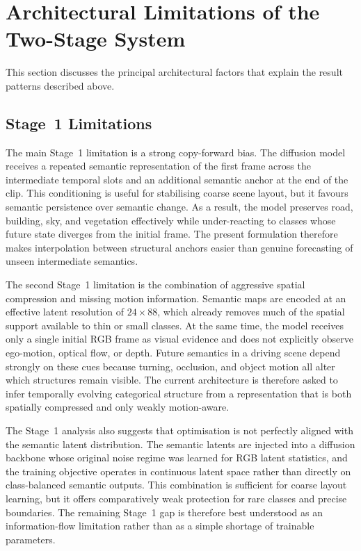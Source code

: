 \FloatBarrier
\section{Architectural Limitations of the Two-Stage System}
\label{sec:stage1_limitations}

This section discusses the principal architectural factors that explain the result patterns described above.

\subsection{Stage~1 Limitations}
\label{subsec:stage1_limitations_detail}

The main Stage~1 limitation is a strong copy-forward bias. The diffusion model receives a repeated semantic representation of the first frame across the intermediate temporal slots and an additional semantic anchor at the end of the clip. This conditioning is useful for stabilising coarse scene layout, but it favours semantic persistence over semantic change. As a result, the model preserves road, building, sky, and vegetation effectively while under-reacting to classes whose future state diverges from the initial frame. The present formulation therefore makes interpolation between structural anchors easier than genuine forecasting of unseen intermediate semantics.

The second Stage~1 limitation is the combination of aggressive spatial compression and missing motion information. Semantic maps are encoded at an effective latent resolution of $24 \times 88$, which already removes much of the spatial support available to thin or small classes. At the same time, the model receives only a single initial RGB frame as visual evidence and does not explicitly observe ego-motion, optical flow, or depth. Future semantics in a driving scene depend strongly on these cues because turning, occlusion, and object motion all alter which structures remain visible. The current architecture is therefore asked to infer temporally evolving categorical structure from a representation that is both spatially compressed and only weakly motion-aware.

The Stage~1 analysis also suggests that optimisation is not perfectly aligned with the semantic latent distribution. The semantic latents are injected into a diffusion backbone whose original noise regime was learned for RGB latent statistics, and the training objective operates in continuous latent space rather than directly on class-balanced semantic outputs. This combination is sufficient for coarse layout learning, but it offers comparatively weak protection for rare classes and precise boundaries. The remaining Stage~1 gap is therefore best understood as an information-flow limitation rather than as a simple shortage of trainable parameters.

